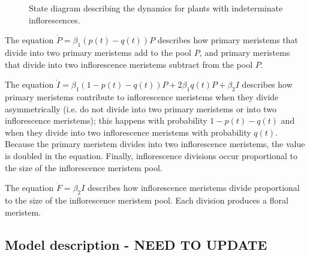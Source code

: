 \documentclass[12pt, oneside,titlepage]{article}   	%
\begin{document}
\begin{figure}[hbt!]
\centering
{}
  \caption{State diagram describing the dynamics for plants with indeterminate inflorescences.}
  \label{fig:state-indeterminate}
\end{figure}

The equation $\dot{P}  = \beta_1 (p(t) - q(t)) P$ describes how primary meristems that divide into two primary meristems add to the pool $P$, and primary meristems that divide into two inflorescence meristems subtract from the pool $P$. 

The equation $\dot{I} = \beta_1 (1-p(t)- q(t) ) P + 2 \beta_1 q(t) P + \beta_2 I $ describes how primary meristems contribute to inflorescence meristems when they divide asymmetrically (i.e. do not divide into two primary meristems or into two inflorescence meristems); this happens with probability $1-p(t)-q(t)$ and when they divide into two inflorescence meristems with probability $q(t)$. Because the primary meristem divides into two inflorescence meristems, the value is doubled in the equation. Finally, inflorescence divisions occur proportional to the size of the inflorescence meristem pool.

The equation $\dot{F} = \beta_2 I$ describes how inflorescence meristems divide proportional to the size of the inflorescence meristem pool. Each division produces a floral meristem.

\subsection{Model description - NEED TO UPDATE}
\end{document}
